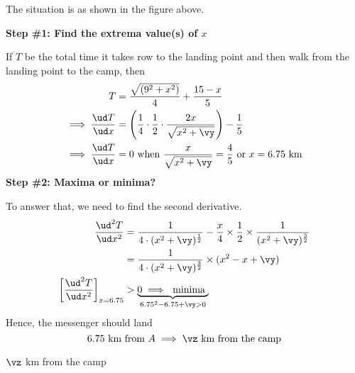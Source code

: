 \begin{solution}[\fullpage]
  The situation is as shown in the figure above. 

 \textbf{Step \#1: Find the extrema value(s) of $x$} 

 If $T$ be the total time it takes row to the landing point  
 and then walk from the landing point to the camp, then
   \begin{align}
       T &= \dfrac{\sqrt{(\vs^2+x^2)}}{\vr} + \dfrac{\vd-x}{\vw} \\
       \implies \dfrac{\ud T}{\ud x} &= \left( \dfrac{1}{\vr}\cdot\dfrac{1}{2}\cdot\dfrac{2x}{\sqrt{x^2+\vy}}\right) - \dfrac{1}{\vw} \\
       \implies \dfrac{\ud T}{\ud x} &= 0\text{ when } \dfrac{x}{\sqrt{x^2+\vy}} = \dfrac{\vr}{\vw}
       \text{ or } x = \vx\text{ km} 
   \end{align}
   \textbf{Step \#2: Maxima or minima?} 
   
   To answer that, we need to find the second derivative.
   \begin{align}
     \dfrac{\ud^2 T}{\ud x^2} &= \dfrac{1}{\vr\cdot(x^2+\vy)^{\frac{1}{2}}} 
                 - \dfrac{x}{\vr}\times\dfrac{1}{2}\times\dfrac{1}{(x^2+\vy)^{\frac{3}{2}}} \\
                         &= \dfrac{1}{\vr\cdot(x^2+\vy)^{\frac{3}{2}}}\times(x^2-x+\vy) \\
     \left[\dfrac{\ud^2 T}{\ud x^2}\right]_{x=\vx} &> \underbrace{0\implies\text{ minima }}_{\vx^2-\vx + \vy > 0}
   \end{align}
   Hence, the messenger should land 
    \[ \vx\text{ km from } A\implies\vz\text{ km from the camp} \] 
\end{solution}
\ifprintanswers\begin{codex}$\vz$ km from the camp\end{codex}\fi
